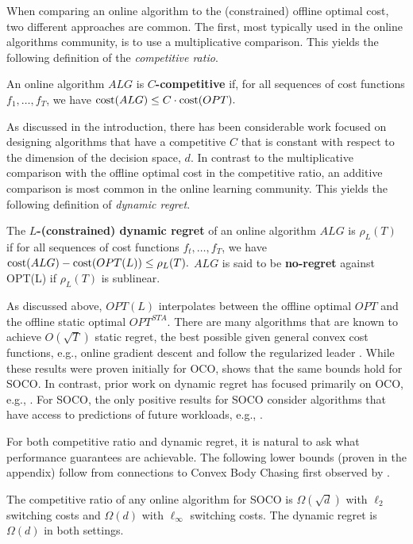 When comparing an online algorithm to the (constrained) offline optimal cost, two different approaches are common.  The first, most typically used in the online algorithms community, is to use a multiplicative comparison. This yields the following definition of the \emph{competitive ratio}.

\begin{definition}
An online algorithm $ALG$ is \textbf{$C$-competitive} if, for all sequences of cost functions $f_1, \ldots, f_T$, we have $\mathrm{cost}(ALG) \le C \cdot \mathrm{cost}(OPT). $
\end{definition}

As discussed in the introduction, there has been considerable work focused on designing algorithms that have a competitive $C$ that is constant with respect to the dimension of the decision space, $d$.  In contrast to the multiplicative comparison with the offline optimal cost in the competitive ratio, an additive comparison is most common in the online learning community.  This yields the following definition of \emph{dynamic regret}.

\begin{definition}
The \textbf{$L$-(constrained) dynamic regret} of an online algorithm $ALG$ is $\rho_L(T)$ if for all sequences of cost functions $f_t, \ldots, f_T$, we have 
$\mathrm{cost}(ALG) - \mathrm{cost}(OPT(L)) \le \rho_L(T).$ $ALG$ is said to be \textbf{no-regret} against OPT(L) if $\rho_L(T)$ is sublinear.
\end{definition}

As discussed above, $OPT(L)$ interpolates between the offline optimal $OPT$ and the offline static optimal $OPT^{STA}$.  There are many algorithms that are known to achieve $O(\sqrt{T})$ static regret, the best possible given general convex cost functions, e.g., online gradient descent \cite{zinkevich2003} and follow the regularized leader \cite{xiao2010}. While these results were proven initially for OCO, \cite{andrew2013} shows that the same bounds hold for SOCO. In contrast, prior work on dynamic regret has focused primarily on OCO, e.g., \cite{herbster2001, bianchi2012,hall2013dynamical}.  For SOCO, the only positive results for SOCO consider algorithms that have access to predictions of future workloads, e.g., \cite{lin2012, chen2015, chen2016}.

For both competitive ratio and dynamic regret, it is natural to ask what performance guarantees are achievable.  The following lower bounds (proven in the appendix) follow from connections to Convex Body Chasing first observed by \cite{antoniadis2016}. 

\begin{proposition} \label{prop: lowerbound}
The competitive ratio of any online algorithm for SOCO is $\Omega(\sqrt{d})$ with $\ell_2$ switching costs and $\Omega(d)$ with $\ell_\infty$ switching costs. The dynamic regret is $\Omega(d)$ in both settings.
\end{proposition}



